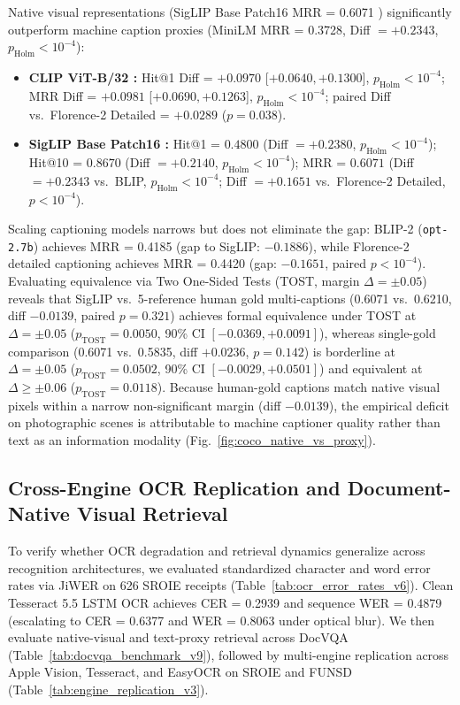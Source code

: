 Native visual representations (SigLIP Base Patch16 MRR = 0.6071 \cite{zhai2023siglip}) significantly outperform machine caption proxies (MiniLM MRR = 0.3728, Diff $= +0.2343$, $p_{\text{Holm}} < 10^{-4}$):
\begin{itemize}
    \setlength{\itemsep}{0.2pt plus 0.1pt}
    \setlength{\parskip}{0pt}
    \item \textbf{CLIP ViT-B/32 \cite{radford2021clip}:} Hit@1 Diff = $+0.0970$ [$+0.0640, +0.1300$], $p_{\text{Holm}} < 10^{-4}$; MRR Diff = $+0.0981$ [$+0.0690, +0.1263$], $p_{\text{Holm}} < 10^{-4}$; paired Diff vs.\ Florence-2 Detailed = $+0.0289$ ($p=0.038$).
    \item \textbf{SigLIP Base Patch16 \cite{zhai2023siglip}:} Hit@1 = $0.4800$ (Diff $= +0.2380$, $p_{\text{Holm}} < 10^{-4}$); Hit@10 = $0.8670$ (Diff $= +0.2140$, $p_{\text{Holm}} < 10^{-4}$); MRR = $0.6071$ (Diff $= +0.2343$ vs.\ BLIP, $p_{\text{Holm}} < 10^{-4}$; Diff $= +0.1651$ vs.\ Florence-2 Detailed, $p < 10^{-4}$).
\end{itemize}
Scaling captioning models narrows but does not eliminate the gap: BLIP-2 (\texttt{opt-2.7b}) \cite{li2023blip2} achieves MRR = 0.4185 (gap to SigLIP: $-0.1886$), while Florence-2 detailed captioning \cite{xiao2024florence2} achieves MRR = 0.4420 (gap: $-0.1651$, paired $p < 10^{-4}$). Evaluating equivalence via Two One-Sided Tests (TOST, margin $\Delta = \pm 0.05$) reveals that SigLIP vs.\ 5-reference human gold multi-captions (0.6071 vs.\ 0.6210, diff $-0.0139$, paired $p=0.321$) achieves formal equivalence under TOST at $\Delta = \pm 0.05$ ($p_{\text{TOST}} = 0.0050$, 90\% CI $[-0.0369, +0.0091]$), whereas single-gold comparison (0.6071 vs.\ 0.5835, diff $+0.0236$, $p=0.142$) is borderline at $\Delta = \pm 0.05$ ($p_{\text{TOST}} = 0.0502$, 90\% CI $[-0.0029, +0.0501]$) and equivalent at $\Delta \ge \pm 0.06$ ($p_{\text{TOST}} = 0.0118$). Because human-gold captions match native visual pixels within a narrow non-significant margin (diff $-0.0139$), the empirical deficit on photographic scenes is attributable to machine captioner quality rather than text as an information modality (Fig.~\ref{fig:coco_native_vs_proxy}).

\subsection{Cross-Engine OCR Replication and Document-Native Visual Retrieval}
\label{sec:cross_engine_replication}

To verify whether OCR degradation and retrieval dynamics generalize across recognition architectures, we evaluated standardized character and word error rates via JiWER \cite{vaessen2024jiwer} on 626 SROIE receipts (Table~\ref{tab:ocr_error_rates_v6}). Clean Tesseract 5.5 LSTM OCR \cite{smith2007tesseract} achieves CER = 0.2939 and sequence WER = 0.4879 (escalating to CER = 0.6377 and WER = 0.8063 under optical blur). We then evaluate native-visual and text-proxy retrieval across DocVQA (Table~\ref{tab:docvqa_benchmark_v9}), followed by multi-engine replication across Apple Vision, Tesseract, and EasyOCR on SROIE and FUNSD (Table~\ref{tab:engine_replication_v3}).

